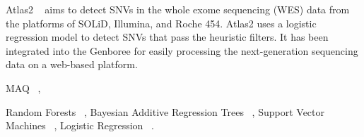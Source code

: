 \documentclass[11pt,reqno]{amsart}
\begin{document}
Atlas2 ~\citep{challis2012integrative} aims to detect SNVs in the whole exome sequencing (WES) data from the platforms of SOLiD, Illumina, and Roche 454.
Atlas2 uses a logistic regression model to detect SNVs that pass the heuristic filters.
It has been integrated into the Genboree for easily processing the next-generation sequencing data on a web-based platform.


MAQ ~\citep{Li2008},

Random Forests ~\citep{Ding2012},
Bayesian Additive Regression Trees ~\citep{Ding2012},
Support Vector Machines ~\citep{Ding2012},
Logistic Regression ~\citep{Ding2012}.




\end{document}
